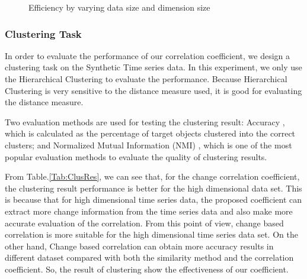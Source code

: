 \begin{figure}
\centering
{}\hspace{0.001em}
\hspace{0.001em}
\caption{Efficiency by varying data size and dimension size}
\label{fig:NNPerf}
\end{figure}


\subsubsection{Clustering Task}

In order to evaluate the performance of our correlation coefficient, we design a clustering task on the Synthetic Time series data. In this experiment, we only use the Hierarchical Clustering \cite{han2011data} to evaluate the performance. Because Hierarchical Clustering is very sensitive to the distance measure used, it is good for evaluating the distance measure.

Two evaluation methods are used for testing the clustering result: Accuracy \cite{han2011data}, which is calculated as the percentage of target objects clustered into the correct clusters; and Normalized Mutual Information (NMI) \cite{han2011data}, which is one of the most popular evaluation methods to evaluate the quality of clustering results.

From Table.\ref{Tab:ClusRes}, we can see that, for the change correlation coefficient, the clustering result performance is better for the high dimensional data set.
This is because that for high dimensional time series data, the proposed coefficient can extract more change information from the time series data and also make more accurate evaluation of the correlation. 
From this point of view, change based correlation is more suitable for the high dimensional time series data set.
On the other hand, Change based correlation can obtain more accuracy results in different dataset compared with both the similarity method and the correlation coefficient. So, the result of clustering show the effectiveness of our coefficient.

